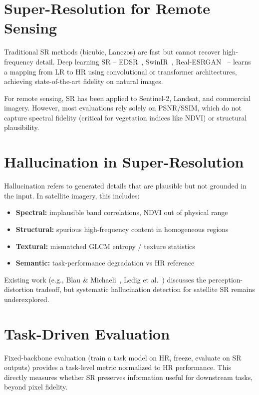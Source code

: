 \section{Super-Resolution for Remote Sensing}
Traditional SR methods (bicubic, Lanczos) are fast but cannot recover high-frequency detail. Deep learning SR -- EDSR~\cite{lim2017enhanced}, SwinIR~\cite{liang2021swinir}, Real-ESRGAN~\cite{wang2021realesrgan} -- learns a mapping from LR to HR using convolutional or transformer architectures, achieving state-of-the-art fidelity on natural images.

For remote sensing, SR has been applied to Sentinel-2, Landsat, and commercial imagery. However, most evaluations rely solely on PSNR/SSIM, which do not capture spectral fidelity (critical for vegetation indices like NDVI) or structural plausibility.

\section{Hallucination in Super-Resolution}
Hallucination refers to generated details that are plausible but not grounded in the input. In satellite imagery, this includes:
\begin{itemize}
    \item \textbf{Spectral:} implausible band correlations, NDVI out of physical range
    \item \textbf{Structural:} spurious high-frequency content in homogeneous regions
    \item \textbf{Textural:} mismatched GLCM entropy / texture statistics
    \item \textbf{Semantic:} task-performance degradation vs HR reference
\end{itemize}
Existing work (e.g., Blau \& Michaeli~\cite{blau2018perception}, Ledig et al.~\cite{ledig2017photo}) discusses the perception-distortion tradeoff, but systematic hallucination detection for satellite SR remains underexplored.

\section{Task-Driven Evaluation}
Fixed-backbone evaluation (train a task model on HR, freeze, evaluate on SR outputs) provides a task-level metric normalized to HR performance. This directly measures whether SR preserves information useful for downstream tasks, beyond pixel fidelity.
